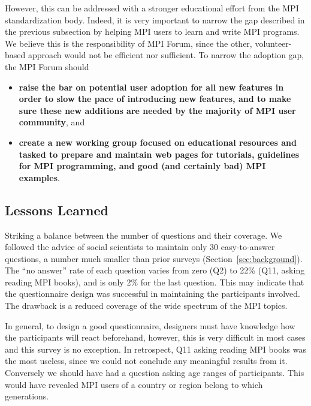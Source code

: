 \documentclass[preprint,5p,times]{elsarticle}
\newcommand{\revision}[2]{{\color{blue}#2}}
\begin{document}
{However, this can be  addressed with a stronger educational effort from the MPI
standardization body. Indeed, it is very important to narrow the gap described in
the previous subsection by helping MPI users to learn and write MPI programs. We
believe this is the responsibility of MPI Forum, since the other,
volunteer-based approach would not be efficient nor sufficient. To narrow the
adoption gap, the MPI Forum should

\begin{itemize}[leftmargin=3ex]
\item {\bf raise the bar on potential user adoption for all new features in
order to slow the pace of introducing new features, and to make sure
these new additions are needed by the majority of MPI user community},
  and
%
\item {\bf create a new working group focused on educational resources and
tasked to prepare and maintain web pages for tutorials, guidelines for MPI
programming, and good (and certainly bad) MPI examples}.
\end{itemize}

\revision{}{
\subsection{Lessons Learned}

\begin{description}[leftmargin=0cm]

\item[Design Strategy]
Striking a balance between the number of questions and their coverage.
We followed the advice of social scientists to maintain
only 30 easy-to-answer questions, a number much smaller than prior
surveys (Section~\ref{sec:background}).
%
The ``no answer'' rate of each
question varies from zero (Q2) to 22\% (Q11, asking reading MPI
books), and is only 2\% for the last question.
This may indicate that the questionnaire design was successful in
maintaining the participants involved. The drawback is a reduced
coverage of the wide spectrum of the MPI topics.
%
\item[Questionnaire Design]
In general, to design a good questionnaire, designers must have
knowledge how the participants will react beforehand, however, this is
very difficult in most cases and this survey is no exception. In
retrospect, Q11 asking reading MPI
books was the most useless, since we could not conclude any meaningful
results from it. Conversely we should have had a question asking age
ranges of participants. This would have revealed MPI users of a
country or region belong to which generations. 


\end{description}}}
\end{document}

